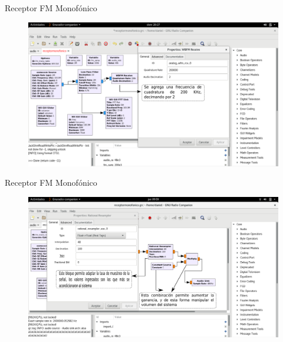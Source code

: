 \begin{frame}{Receptor FM Monofónico}

\begin{figure}[H]
\centering
\vspace{-3mm}
\includegraphics[width=\textwidth]{parte3/lab8/pdf/lab8_4.pdf}
\end{figure}

\end{frame}

\begin{frame}{Receptor FM Monofónico}

\begin{figure}[H]
\centering
\vspace{-3mm}
\includegraphics[width=\textwidth]{parte3/lab8/pdf/lab8_5.pdf}
\end{figure}

\end{frame}

